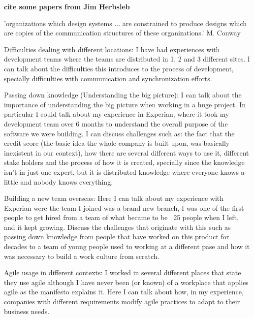 \documentclass[12pt, letterpaper]{article}
\newcommand{\todo}[1]
  {{\scriptsize \textbf{\color{red} {#1}}}}
\begin{document}
\cite{Newell06} 

\cite{Steinmacher12} 

\cite{Dagenais10} 

\cite{Razavi06} 

\cite{Whitworth06} 

\todo{cite some papers from Jim Herbsleb}


'organizations which design systems ... are constrained to produce designs which are copies of the communication structures of these organizations.' M. Conway
 
 
Difficulties dealing with different locations: I have had experiences with development teams where the teams are distributed in 1, 2 and 3 different sites. I can talk about the difficulties this introduces to the process of development, specially difficulties with communication and synchronization efforts.

Passing down knowledge (Understanding the big picture): I can talk about the importance of understanding the big picture when working in a huge project. In particular I could talk about my experience in Experian, where it took my development team over 6 months to understand the overall purpose of the software we were building. I can discuss challenges such as: the fact that the credit score (the basic idea the whole company is built upon, was basically inexistent in our context), how there are several different ways to use it, different stake holders and the process of how it is created, specially since the knowledge isn't in just one expert, but it is distributed knowledge where everyone knows a little and nobody knows everything.

Building a new team overseas: Here I can talk about my experience with Experian were the team I joined was a brand new branch, I was one of the first people to get hired from a team of what became to be ~25 people when I left, and it kept growing. Discuss the challenges that originate with this such as passing down knowledge from people that have worked on this product for decades to a team of young people used to working at a different pase and how it was necessary to build a work culture from scratch.

Agile usage in different contexts: I worked in several different places that state they use agile although I have never been (or known) of a  workplace that applies agile as the manifesto explains it. Here I can talk about how, in my experience, companies with different requirements modify agile practices to adapt to their business needs.
\end{document}
